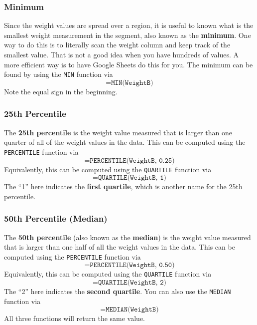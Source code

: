 \subsubsection{Minimum}
Since the weight values are spread over a region, it is useful to known what is the smallest weight measurement in the segment, also known as the \textbf{minimum}. One way to do this is to literally scan the weight column and keep track of the smallest value. That is not a good idea when you have hundreds of values. A more efficient way is to have Google Sheets do this for you. The minimum can be found by using the \texttt{MIN} function via
\begin{equation}
    \texttt{=MIN(WeightB)}
\end{equation}
Note the equal sign in the beginning.
\subsubsection{25th Percentile}
The \textbf{25th percentile} is the weight value measured that is larger than one quarter of all of the weight values in the data. This can be computed using the \texttt{PERCENTILE} function via
\begin{equation}
    \texttt{=PERCENTILE(WeightB, 0.25)}
\end{equation}
Equivalently, this can be computed using the \texttt{QUARTILE} function via
\begin{equation}
    \texttt{=QUARTILE(WeightB, 1)}
\end{equation}
The ``1'' here indicates the \textbf{first quartile}, which is another name for the 25th percentile.
\subsubsection{50th Percentile (Median)}
The \textbf{50th percentile} (also known as the \textbf{median}) is the weight value measured that is larger than one half of all the weight values in the data. This can be computed using the \texttt{PERCENTILE} function via
\begin{equation}
    \texttt{=PERCENTILE(WeightB, 0.50)}
\end{equation}
Equivalently, this can be computed using the \texttt{QUARTILE} function via
\begin{equation}
    \texttt{=QUARTILE(WeightB, 2)}
\end{equation}
The ``2'' here indicates the \textbf{second quartile}. You can also use the \texttt{MEDIAN} function via
\begin{equation}
    \texttt{=MEDIAN(WeightB)}
\end{equation}
All three functions will return the same value.
